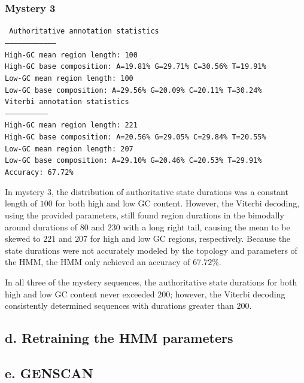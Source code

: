 \documentclass[a4paper]{article}
\begin{document}
\subsubsection*{Mystery 3}
{\tt
Authoritative annotation statistics\\
-----------------------------------\\
High-GC mean region length:  100\\
High-GC base composition: A=19.81\% G=29.71\% C=30.56\% T=19.91\%\\
Low-GC mean region length:  100\\
Low-GC base composition: A=29.56\% G=20.09\% C=20.11\% T=30.24\%\\

\noindent Viterbi annotation statistics\\
-----------------------------\\
High-GC mean region length:  221\\
High-GC base composition: A=20.56\% G=29.05\% C=29.84\% T=20.55\%\\
Low-GC mean region length:  207\\
Low-GC base composition: A=29.10\% G=20.46\% C=20.53\% T=29.91\%\\

\noindent Accuracy: 67.72\%\\
}

In mystery 3, the distribution of authoritative state durations was
a constant length of $100$ for both high and low GC content. However,
the Viterbi decoding, using the provided parameters, still found
region durations in the bimodally around durations of $80$ and $230$
with a long right tail, causing the mean to be skewed to $221$ and $207$
for high and low GC regions, respectively. Because the state durations
were not accurately modeled by the topology and parameters of the HMM,
the HMM only achieved an accuracy of $67.72\%$.

In all three of the mystery sequences, the authoritative
state durations for both high and low GC content never
exceeded $200$; however, the Viterbi decoding consistently
determined sequences with durations greater than $200$.

\subsection*{d. Retraining the HMM parameters}


\subsection*{e. GENSCAN}
\end{document}
